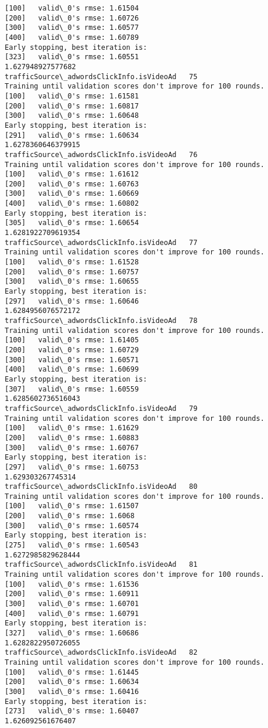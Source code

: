\documentclass[11pt]{article}
\begin{document}
\begin{Verbatim}[commandchars=\\\{\}]
[100]	valid\_0's rmse: 1.61504
[200]	valid\_0's rmse: 1.60726
[300]	valid\_0's rmse: 1.60577
[400]	valid\_0's rmse: 1.60789
Early stopping, best iteration is:
[323]	valid\_0's rmse: 1.60551
1.627948927577682
trafficSource\_adwordsClickInfo.isVideoAd   75
Training until validation scores don't improve for 100 rounds.
[100]	valid\_0's rmse: 1.61581
[200]	valid\_0's rmse: 1.60817
[300]	valid\_0's rmse: 1.60648
Early stopping, best iteration is:
[291]	valid\_0's rmse: 1.60634
1.6278360646379915
trafficSource\_adwordsClickInfo.isVideoAd   76
Training until validation scores don't improve for 100 rounds.
[100]	valid\_0's rmse: 1.61612
[200]	valid\_0's rmse: 1.60763
[300]	valid\_0's rmse: 1.60669
[400]	valid\_0's rmse: 1.60802
Early stopping, best iteration is:
[305]	valid\_0's rmse: 1.60654
1.6281922709619354
trafficSource\_adwordsClickInfo.isVideoAd   77
Training until validation scores don't improve for 100 rounds.
[100]	valid\_0's rmse: 1.61528
[200]	valid\_0's rmse: 1.60757
[300]	valid\_0's rmse: 1.60655
Early stopping, best iteration is:
[297]	valid\_0's rmse: 1.60646
1.6284956076572172
trafficSource\_adwordsClickInfo.isVideoAd   78
Training until validation scores don't improve for 100 rounds.
[100]	valid\_0's rmse: 1.61405
[200]	valid\_0's rmse: 1.60729
[300]	valid\_0's rmse: 1.60571
[400]	valid\_0's rmse: 1.60699
Early stopping, best iteration is:
[307]	valid\_0's rmse: 1.60559
1.6285602736516043
trafficSource\_adwordsClickInfo.isVideoAd   79
Training until validation scores don't improve for 100 rounds.
[100]	valid\_0's rmse: 1.61629
[200]	valid\_0's rmse: 1.60883
[300]	valid\_0's rmse: 1.60767
Early stopping, best iteration is:
[297]	valid\_0's rmse: 1.60753
1.629303267745314
trafficSource\_adwordsClickInfo.isVideoAd   80
Training until validation scores don't improve for 100 rounds.
[100]	valid\_0's rmse: 1.61507
[200]	valid\_0's rmse: 1.6068
[300]	valid\_0's rmse: 1.60574
Early stopping, best iteration is:
[275]	valid\_0's rmse: 1.60543
1.6272985829628444
trafficSource\_adwordsClickInfo.isVideoAd   81
Training until validation scores don't improve for 100 rounds.
[100]	valid\_0's rmse: 1.61536
[200]	valid\_0's rmse: 1.60911
[300]	valid\_0's rmse: 1.60701
[400]	valid\_0's rmse: 1.60791
Early stopping, best iteration is:
[327]	valid\_0's rmse: 1.60686
1.6282822950726055
trafficSource\_adwordsClickInfo.isVideoAd   82
Training until validation scores don't improve for 100 rounds.
[100]	valid\_0's rmse: 1.61445
[200]	valid\_0's rmse: 1.60634
[300]	valid\_0's rmse: 1.60416
Early stopping, best iteration is:
[273]	valid\_0's rmse: 1.60407
1.626092561676407

\end{Verbatim}
\end{document}
